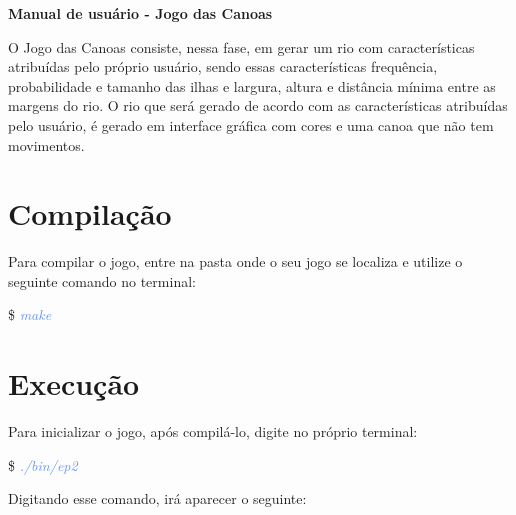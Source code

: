 \documentclass[a4paper,12pt]{article}
\begin{document}
  \begin{center}
	{\LARGE \textcolor{NavyBlue}{ \textbf{Manual de usuário - Jogo das Canoas}}}
  \end{center}

  \bigskip
  \bigskip

  O Jogo das Canoas consiste, nessa fase, em gerar um rio com 
  características atribuídas pelo próprio usuário, sendo essas características 
  frequência, probabilidade e tamanho das ilhas e largura, altura e distância
  mínima entre as margens do rio. O rio que será gerado de acordo com as 
  características atribuídas pelo usuário, é gerado em 
  interface gráfica com cores e uma canoa que não tem movimentos.


\newpage %
\section{\textcolor{NavyBlue}{Compilação}}

Para compilar o jogo, entre na pasta onde o seu jogo se localiza e utilize o seguinte comando no terminal:

\$ \textcolor{CornflowerBlue}{\textit{make}}

\bigskip
\section{\textcolor{NavyBlue}{Execução}}

  Para inicializar o jogo, após compilá-lo, digite no próprio terminal:
  
  \$ \textcolor{CornflowerBlue}{\textit{./bin/ep2}}
  
  Digitando esse comando, irá aparecer o seguinte:
\end{document}
